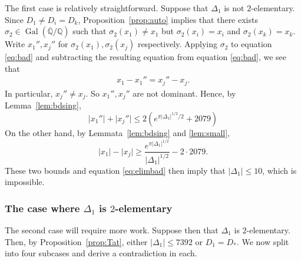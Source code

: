 \documentclass[12pt,a4paper,oneside]{amsart}
\DeclareMathOperator{\gal}{Gal}
\begin{document}
The first case is relatively straightforward.
Suppose that $\Delta_1$ is not $2$-elementary. Since $D_1 \neq D_i = D_k$, Proposition~\ref{prop:auto} implies that there exists $\sigma_2 \in \gal(\overline{\mathbb{Q}} / \mathbb Q)$ such that $\sigma_2(x_1) \neq x_1$ but $\sigma_2(x_i) = x_i$ and $\sigma_2(x_k) = x_k$. Write $x_1'', x_j''$ for $\sigma_2(x_1), \sigma_2(x_j)$ respectively. Applying $\sigma_2$ to equation \eqref{eq:bad} and subtracting the resulting equation from equation \eqref{eq:bad}, we see that
\begin{align}\label{eq:elimbad}
	 x_1 - x_1'' = x_j'' - x_j.
	 \end{align}
In particular, $x_j'' \neq x_j$. So $x_1'', x_j''$ are not dominant. Hence, by Lemma~\ref{lem:bdsing},
\[ \lvert x_1'' \rvert + \lvert x_j'' \rvert \leq 2(e^{\pi \lvert \Delta_1 \rvert^{1/2}/2} +2079)\]
 On the other hand, by Lemmata~\ref{lem:bdsing} and \ref{lem:small},
\[ \lvert x_1 \rvert - \lvert x_j \rvert \geq \frac{e^{\pi \lvert \Delta_1 \rvert^{1/2}}}{\lvert \Delta_1 \rvert^{1/2}} - 2 \cdot 2079.\]
 These two bounds and equation \eqref{eq:elimbad} then imply that $\lvert \Delta_1 \rvert \leq 10$, which is impossible. 

\subsubsection{The case where $\Delta_1$ is $2$-elementary}\label{subsub:Delta1Listed}

The second case will require more work. 
Suppose then that $\Delta_1$ is $2$-elementary. Then, by Proposition~\ref{prop:Tat}, either $\lvert \Delta_1 \rvert \leq 7392$ or $D_1 = D_*$. 
We now split into four subcases and derive a contradiction in each.
\end{document}
